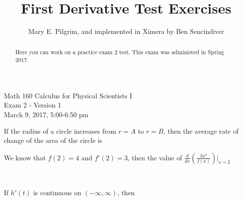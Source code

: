 \documentclass[handout]{ximera}
\author{Mary E. Pilgrim, and implemented in Ximera by Ben Sencindiver}
\title{First Derivative Test Exercises}
\begin{document}
\begin{abstract}
  Here you can work on a practice exam 2 test. This exam was administed in Spring 2017.
\end{abstract}
\maketitle


\begin{center}
\Large{Math 160 Calculus for Physical Scientists I \\ Exam 2 - Version 1 \\ March 9, 2017, 5:00-6:50 pm}
\end{center}


\begin{problem}
If the radius of a circle increases from $r=A$ to $r=B$, then the average rate of change of the area of the circle is

\begin{multipleChoice}
\end{multipleChoice}
\end{problem}



\begin{problem}
We know that $f(2)=4$ and $f'(2)=3$, then the value of $\displaystyle\frac{d}{dx}\left(\frac{3x^2}{f(x)}\right)\bigg|_{x=2}$

\begin{multipleChoice}
	\\
\end{multipleChoice}
\end{problem}


\begin{problem}
If $h'(t)$ is continuous on $(-\infty,\infty)$, then 
\begin{multipleChoice}
\end{multipleChoice}
\end{problem}
\end{document}
